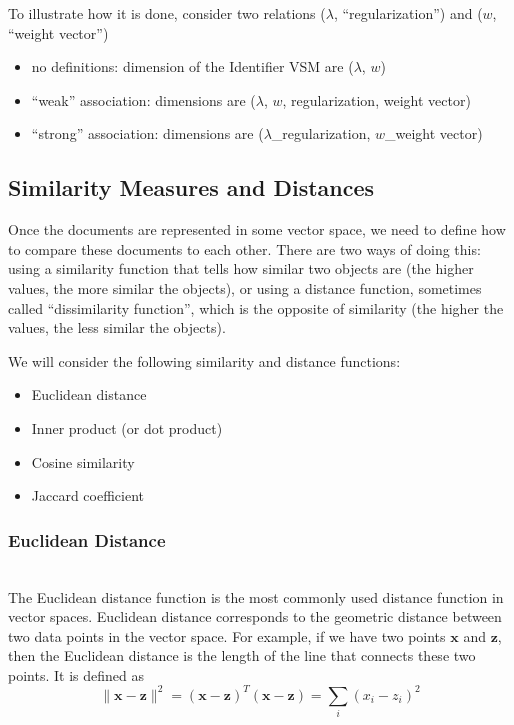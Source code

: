 To illustrate how it is done, consider two relations ($\lambda$, ``regularization'')
and ($w$, ``weight vector'')


\begin{itemize}\itemsep1pt\parskip0pt
  \item no definitions: dimension of the Identifier VSM are ($\lambda$, $w$)
  \item ``weak'' association:  dimensions are ($\lambda$, $w$, regularization, weight vector)
  \item ``strong'' association:  dimensions are ($\lambda$\_regularization, $w$\_weight vector)
\end{itemize}



\subsection{Similarity Measures and Distances} \label{sec:similarity-distance}

Once the documents are represented in some vector space, we need to
define how to compare these documents to each other. There are two
ways of doing this: using a similarity function that tells how similar
two objects are (the higher values, the more similar the objects),
or using a distance function, sometimes called ``dissimilarity function'',
which is the opposite of similarity (the higher the values, the less similar
the objects).

We will consider the following similarity and distance functions:


\begin{itemize}\itemsep1pt\parskip0pt
  \item Euclidean distance
  \item Inner product (or dot product)
  \item Cosine similarity
  \item Jaccard coefficient
\end{itemize}


\subsubsection{Euclidean Distance} \ \\

The Euclidean distance function is the most commonly used distance
function in vector spaces. Euclidean distance corresponds to
the geometric distance between two data points in the vector space.
For example, if we have two points $\mathbf x$ and
$\mathbf z$, then the Euclidean distance is the
length of the line that connects these two points.
It is defined as
$$\| \mathbf x - \mathbf z \|^2 = (\mathbf x - \mathbf z)^T (\mathbf x - \mathbf z)  =\sum_i (x_i - z_i)^2$$

